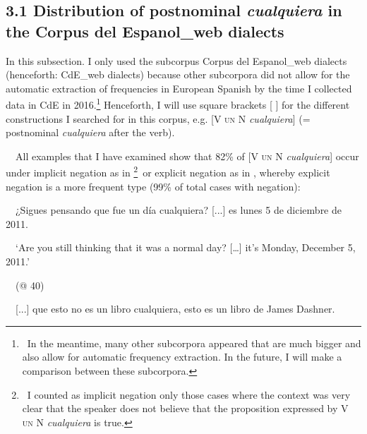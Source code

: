 \subsection[3.1 Distribution of postnominal cualquiera in the Corpus del Espanol\_web dialects]{\textbf{3.1 Distribution of postnominal }\textbf{\textit{cualquiera }}\textbf{in the Corpus del Espanol\_web dialects}}
\begin{styleStandard}
In this subsection. I only used the subcorpus Corpus del Espanol\_web dialects (henceforth: CdE\_web dialects) because other subcorpora did not allow for the automatic extraction of frequencies in European Spanish by the time I collected data in CdE in 2016.\footnote{\ \textrm{In the meantime, many other subcorpora appeared that are much bigger and also allow for automatic frequency extraction. In the future, I will make a comparison between these subcorpora.}} Henceforth, I will use square brackets [ ] for the different constructions I searched for in this corpus, e.g. [V \textsc{un} N \textit{cualquiera}] (= postnominal \textit{cualquiera} after the verb).
\end{styleStandard}

\begin{styleStandard}
\ \ All examples that I have examined show that 82\% of [V \textsc{un} N \textit{cualquiera}] occur under implicit negation as in \footnote{\textrm{\ I counted as implicit negation only those cases where the context was very clear that the speaker does not believe that the proposition expressed by V }\textsc{un}\textrm{ N }\textrm{\textit{cualquiera}}\textrm{ is true.}}\ or explicit negation as in , whereby explicit negation is a more frequent type (99\% of total cases with negation):
\end{styleStandard}

\begin{styleStandard}
\label{bkm:Ref42868256}\ \ ¿Sigues pensando que fue un día cualquiera? [...] es lunes 5 de diciembre de 2011.
\end{styleStandard}

\begin{styleStandard}
\ \ ‘Are you still thinking that it was a normal day? […] it’s Monday, December 5, 2011.’
\end{styleStandard}

\begin{styleStandard}
\ \ (@ 40)
\end{styleStandard}

\begin{styleStandard}
\label{bkm:Ref42868258}\ \ [...] que esto no es un libro cualquiera, esto es un libro de James Dashner.
\end{styleStandard}

